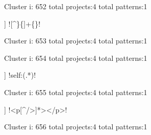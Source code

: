 Cluster i: 652
total projects:4
total patterns:1
\begin{multicols}{1}
\begin{description}[noitemsep,topsep=0pt]
\item [[4] ] \cverb![^\}\{]+\{\}!
\end{description}
\end{multicols}







Cluster i: 653
total projects:4
total patterns:1
\begin{multicols}{1}
\end{multicols}







Cluster i: 654
total projects:4
total patterns:1
\begin{multicols}{1}
\begin{description}[noitemsep,topsep=0pt]
\item [[4] ] \cverb!self:\s*(.*)\s*!
\end{description}
\end{multicols}







Cluster i: 655
total projects:4
total patterns:1
\begin{multicols}{1}
\begin{description}[noitemsep,topsep=0pt]
\item [[4] ] \cverb!<p[^/>]*>\s*</p>!
\end{description}
\end{multicols}







Cluster i: 656
total projects:4
total patterns:1
\begin{multicols}{1}
\end{multicols}







